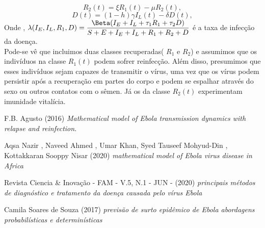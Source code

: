 \documentclass[12pt,a4paper]{article}
\begin{document}
$$R_2(t) = \xi R_1(t) - \mu R_2(t) ,$$
$$D(t) = (1 - h)\gamma I_L(t) - \delta D(t) ,$$
Onde , $\lambda(I_E,I_L,R_1,D) = \dfrac{\Beta (I_E + I_L + \tau_1 R_1 + \tau_2 D)}{S + E + I_E + I_L + R_1 + R_2 + D}$ é a taxa de infecção da doença. \vspace{3mm}\\
Pode-se vê que incluimos duas classes recuperadas( $R_1$ e $R_2$) e assumimos que os indivíduos na classe $R_1(t)$ podem sofrer reinfecção. Além disso, presumimos que esses indivíduos sejam capazes de transmitir o vírus, uma vez que os vírus podem persistir após a recuperação em partes do corpo e podem se espalhar através do sexo ou outros contatos com o sêmen. Já os da classe $R_2(t)$ experimentam imunidade vitalícia.

\newpage
\begin{thebibliography}{9}
F.B. Agusto (2016) \emph{Mathematical model of Ebola transmission dynamics with relapse and reinfection}.

Aqsa Nazir , Naveed Ahmed , Umar Khan, Syed Tauseef Mohyud-Din , Kottakkaran Sooppy Nisar (2020) \emph{mathematical model of Ebola virus disease in Africa} 

Revista Ciencia & Inovação - FAM - V.5, N.1 - JUN - (2020) \emph{principais métodos de diagnóstico
e tratamento da doença causada pelo vírus Ebola} 

Camila Soares de Souza (2017) \emph{previsão de surto epidêmico de Ebola abordagens probabilísticas e determinísticas}

\end{thebibliography}
\end{document}
